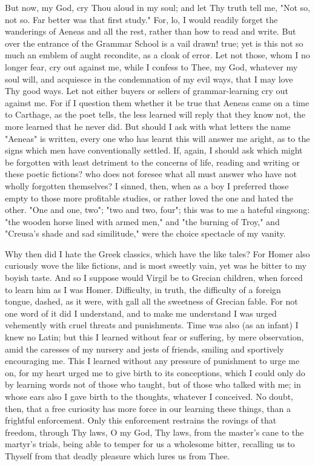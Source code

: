 \documentclass[b5paper,openright,12pt,twoside]{book}
\begin{document}
But now, my God, cry Thou aloud in my soul; and let Thy truth tell me,
"Not so, not so. Far better was that first study." For, lo, I would
readily forget the wanderings of Aeneas and all the rest, rather than
how to read and write. But over the entrance of the Grammar School is a
vail drawn! true; yet is this not so much an emblem of aught recondite,
as a cloak of error. Let not those, whom I no longer fear, cry out
against me, while I confess to Thee, my God, whatever my soul will, and
acquiesce in the condemnation of my evil ways, that I may love Thy
good ways. Let not either buyers or sellers of grammar-learning cry out
against me. For if I question them whether it be true that Aeneas came
on a time to Carthage, as the poet tells, the less learned will reply
that they know not, the more learned that he never did. But should I ask
with what letters the name "Aeneas" is written, every one who has
learnt this will answer me aright, as to the signs which men have
conventionally settled. If, again, I should ask which might be forgotten
with least detriment to the concerns of life, reading and writing or
these poetic fictions? who does not foresee what all must answer who
have not wholly forgotten themselves? I sinned, then, when as a boy I
preferred those empty to those more profitable studies, or rather loved
the one and hated the other. "One and one, two"; "two and two, four";
this was to me a hateful singsong: "the wooden horse lined with
armed men," and "the burning of Troy," and "Creusa's shade and sad
similitude," were the choice spectacle of my vanity.

Why then did I hate the Greek classics, which have the like tales? For
Homer also curiously wove the like fictions, and is most sweetly vain,
yet was he bitter to my boyish taste. And so I suppose would Virgil
be to Grecian children, when forced to learn him as I was Homer.
Difficulty, in truth, the difficulty of a foreign tongue, dashed, as it
were, with gall all the sweetness of Grecian fable. For not one word of
it did I understand, and to make me understand I was urged vehemently
with cruel threats and punishments. Time was also (as an infant) I
knew no Latin; but this I learned without fear or suffering, by mere
observation, amid the caresses of my nursery and jests of friends,
smiling and sportively encouraging me. This I learned without any
pressure of punishment to urge me on, for my heart urged me to give
birth to its conceptions, which I could only do by learning words not of
those who taught, but of those who talked with me; in whose ears also I
gave birth to the thoughts, whatever I conceived. No doubt, then, that
a free curiosity has more force in our learning these things, than a
frightful enforcement. Only this enforcement restrains the rovings of
that freedom, through Thy laws, O my God, Thy laws, from the master's
cane to the martyr's trials, being able to temper for us a wholesome
bitter, recalling us to Thyself from that deadly pleasure which lures us
from Thee.
\end{document}
